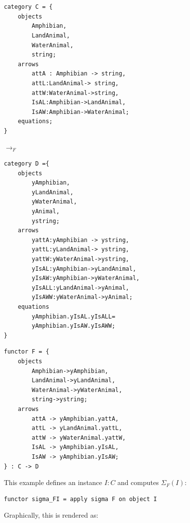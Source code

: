 \documentclass[12pt]{article}
\begin{document}
 \begin{minipage}{0.4\textwidth}
\begin{verbatim} 


category C = {
	objects 
		Amphibian,
		LandAnimal,
		WaterAnimal,
		string;
	arrows
		attA : Amphibian -> string, 
		attL:LandAnimal-> string, 
		attW:WaterAnimal->string,
		IsAL:Amphibian->LandAnimal,
		IsAW:Amphibian->WaterAnimal;
	equations;
} \end{verbatim}
  \end{minipage}
   \hspace{.5in} $\to_F$ \hspace{.5in}
  \begin{minipage}{0.4\textwidth}
\begin{verbatim} 
category D ={
	objects 
		yAmphibian,
		yLandAnimal,
		yWaterAnimal,
		yAnimal,
		ystring;
	arrows
		yattA:yAmphibian -> ystring, 
		yattL:yLandAnimal-> ystring, 
		yattW:yWaterAnimal->ystring,
		yIsAL:yAmphibian->yLandAnimal,
		yIsAW:yAmphibian->yWaterAnimal,
		yIsALL:yLandAnimal->yAnimal,
		yIsAWW:yWaterAnimal->yAnimal;
	equations
		yAmphibian.yIsAL.yIsALL=
		yAmphibian.yIsAW.yIsAWW;
}
\end{verbatim} \end{minipage}
\begin{verbatim}
functor F = {
	objects 
		Amphibian->yAmphibian,
		LandAnimal->yLandAnimal,
		WaterAnimal->yWaterAnimal,
		string->ystring;
	arrows
		attA -> yAmphibian.yattA, 
		attL -> yLandAnimal.yattL, 
		attW -> yWaterAnimal.yattW,
		IsAL -> yAmphibian.yIsAL,
		IsAW -> yAmphibian.yIsAW;
} : C -> D
\end{verbatim}
This example defines an instance $I : C$ and computes $\Sigma_F(I)$:
\begin{verbatim}
functor sigma_FI = apply sigma F on object I
\end{verbatim}
Graphically, this is rendered as:
\end{document}

